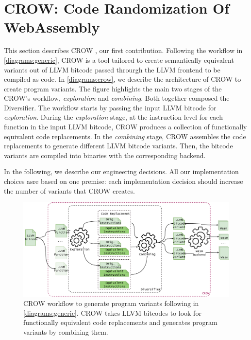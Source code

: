 
\section{CROW: Code Randomization Of WebAssembly}
\label{section:crow}


This section describes CROW \cite{CROW}, our first contribution. Following the workflow in \autoref{diagrams:generic}, CROW is a tool tailored to create semantically equivalent \wasm variants out of LLVM bitcode passed throurgh the LLVM frontend to be compiled as \wasm code.
In \autoref{diagrams:crow}, we describe the architecture of CROW to create program variants.
The figure highlights the main two stages of the CROW's workflow, \textit{exploration} and \textit{combining}. Both together composed the Diversifier. The workflow starts by passing the input LLVM bitcode for \emph{exploration}. During the \emph{exploration} stage, at the instruction level for each function in the input LLVM bitcode, CROW produces a collection of functionally equivalent code replacements.  
In the \emph{combining} stage, CROW assembles the code replacements to generate different LLVM bitcode variants. 
Then, the bitcode variants are compiled into \wasm binaries with the corresponding backend. 

In the following, we describe our engineering decisions. All our implementation choices asre based on one premise: each implementation decision should increase the number of \wasm variants that CROW creates.


\begin{figure}[h]
    \includegraphics[width=\linewidth]{diagrams/generation/crow.drawio.pdf}
    \caption{CROW workflow to generate program variants following  in \autoref{diagrams:generic}. CROW takes LLVM bitcodes to look for functionally equivalent code replacements and generates program variants by combining them.}
    \label{diagrams:crow}
\end{figure}


